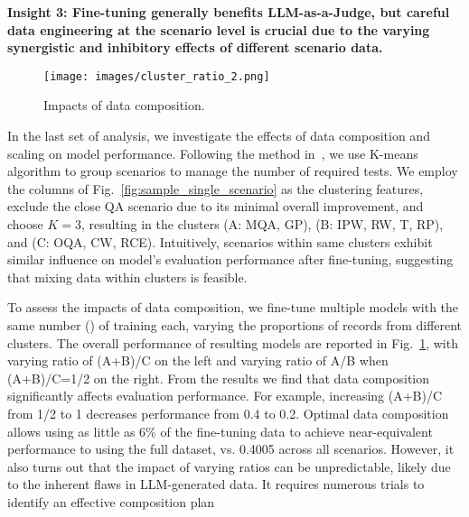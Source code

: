 \textbf{Insight 3: Fine-tuning  generally benefits  LLM-as-a-Judge, but careful data engineering at the scenario level is crucial due to the varying synergistic and inhibitory effects of different scenario data.}






\begin{figure}[t]
    \centering
    \texttt{[image: images/cluster\_ratio\_2.png]}
    \caption{Impacts of data composition.}
    \label{fig:cluster_ratio}
\end{figure}


\vspace{1ex}
In the last set of analysis, we investigate the effects of data composition and scaling on model performance. 
Following the method in~\cite{shao2024balanceddatasamplinglanguage,yang2024smalltolarges2lscalabledata}, we use K-means algorithm to group scenarios to manage the number of required tests. We employ the columns of Fig.~\ref{fig:sample_single_scenario} as the clustering features, exclude the close QA scenario due to its minimal overall improvement, and choose $K=3$, resulting in the clusters (A: MQA, GP), (B: IPW, RW, T, RP), and (C: OQA, CW, RCE). Intuitively, scenarios within same clusters exhibit similar influence on model's evaluation performance after fine-tuning, suggesting that mixing data within clusters is feasible.


To assess the impacts of data composition, we fine-tune multiple models with the same number () of training each, varying the proportions of records from different clusters. The overall performance of resulting models are reported in Fig.~\ref{fig:cluster_ratio}, with varying ratio of (A+B)/C on the left and varying ratio of A/B when (A+B)/C=1/2 on the right. From the results we find that data composition significantly affects evaluation performance. For example, increasing (A+B)/C from 1/2 to 1 decreases performance from 0.4 to 0.2.
Optimal data composition allows using as little as 6\% of the fine-tuning data to achieve near-equivalent performance to using the full dataset,  vs. 0.4005 across all scenarios.
However, it also turns out that the impact of varying ratios can be unpredictable, likely due to the inherent flaws in LLM-generated data. It requires numerous trials to identify an effective composition plan

